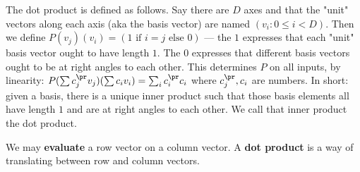         The dot product is defined as follows.  Say there are $D$ axes and that
        the "unit" vectors along each axis (aka the basis vector) are named
        $(v_i:0\leq i<D)$.  Then we define $P(v_j)(v_i) = (1 \text{ if } i=j
        \text{ else } 0)$ --- the $1$ expresses that each "unit" basis vector
        ought to have length $1$.  The $0$ expresses that different basis
        vectors ought to be at right angles to each other.  This determines $P$
        on all inputs, by linearity: $P(\sum c^\pr_j v_j)(\sum c_i v_i)=\sum_i
        c^\pr_i c_i$ where $c^\pr_j,c_i$ are numbers.  In short: given a basis,
        there is a unique inner product such that those basis elements all have
        length $1$ and are at right angles to each other.  We call that inner
        product the dot product.


        We may \textbf{evaluate} a row vector on a column vector.   A \textbf{dot product} is a way of translating between row and
        column vectors.  




